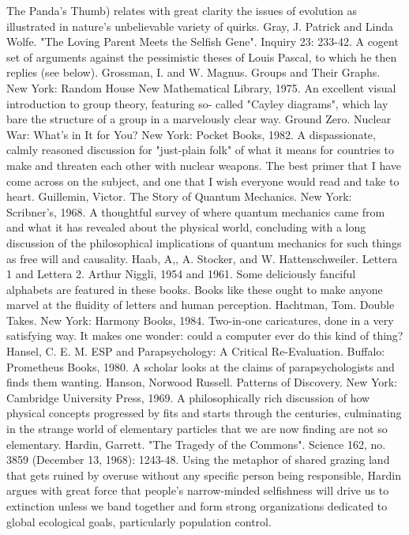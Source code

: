  The Panda's Thumb) relates with great clarity the issues of evolution as illustrated in
 nature's unbelievable variety of quirks.
Gray, J. Patrick and Linda Wolfe. "The Loving Parent Meets the Selfish Gene". Inquiry 23:
 233-42. A cogent set of arguments against the pessimistic theses of Louis Pascal, to which
 he then replies (see below).
Grossman, I. and W. Magnus. Groups and Their Graphs. New York: Random House New
 Mathematical Library, 1975. An excellent visual introduction to group theory, featuring so-
 called "Cayley diagrams", which lay bare the structure of a group in a marvelously clear
 way.
Ground Zero. Nuclear War: What's in It for You? New York: Pocket Books, 1982. A
 dispassionate, calmly reasoned discussion for "just-plain folk" of what it means for
 countries to make and threaten each other with nuclear weapons. The best primer that I have
 come across on the subject, and one that I wish everyone would read and take to heart.
Guillemin, Victor. The Story of Quantum Mechanics. New York: Scribner's, 1968. A
 thoughtful survey of where quantum mechanics came from and what it has revealed about
 the physical world, concluding with a long discussion of the philosophical implications of
 quantum mechanics for such things as free will and causality.
Haab, A,, A. Stocker, and W. Hattenschweiler. Lettera 1 and Lettera 2. Arthur Niggli, 1954
 and 1961. Some deliciously fanciful alphabets are featured in these books. Books like these
 ought to make anyone marvel at the fluidity of letters and human perception.
Hachtman, Tom. Double Takes. New York: Harmony Books, 1984. Two-in-one caricatures,
 done in a very satisfying way. It makes one wonder: could a computer ever do this kind of
 thing?
Hansel, C. E. M. ESP and Parapsychology: A Critical Re-Evaluation. Buffalo: Prometheus
 Books, 1980. A scholar looks at the claims of parapsychologists and finds them wanting.
 Hanson, Norwood Russell. Patterns of Discovery. New York: Cambridge University Press,
 1969. A philosophically rich discussion of how physical concepts progressed by fits and
 starts through the centuries, culminating in the strange world of elementary particles that we
 are now finding are not so elementary.
Hardin, Garrett. "The Tragedy of the Commons". Science 162, no. 3859 (December 13,
 1968): 1243-48. Using the metaphor of shared grazing land that gets ruined by overuse
 without any specific person being responsible, Hardin argues with great force that people's
 narrow-minded selfishness will drive us to extinction unless we band together and form
 strong organizations dedicated to global ecological goals, particularly population control.

